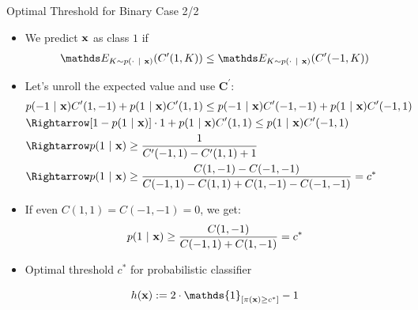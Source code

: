 \documentclass[11pt,compress,t,notes=noshow, aspectratio=169, xcolor=table]{beamer}
\begin{document}
\begin{frame}{Optimal Threshold for Binary Case 2/2}
            \begin{itemize}
            \item We predict $\mathbf{x}$ as class $1$ if 
            \begin{align*}
                \E_{K \sim p(\cdot ~|~ \xv)}( C^\prime(1,K) )  \leq \E_{K \sim p(\cdot ~|~ \xv)}( C^\prime(-1,K) ) \\
            \end{align*}

			\item Let's unroll the expected value and use $\mathbf{C}^\prime$:
            \footnotesize{
    			\begin{align*}	
                    & p(-1 ~|~ \xv ) C^\prime(1,-1)  + 	p(1 ~|~ \xv ) C^\prime(1,1) \leq  p(-1 ~|~ \xv ) C^\prime(-1,-1)  + 	p(1 ~|~ \xv ) C^\prime(-1,1)  \\ 
                    &\Rightarrow [1 - p(1 ~|~ \xv)] \cdot 1 + p(1 ~|~ \xv) C^\prime(1, 1) \leq p(1 ~|~ \xv) C^\prime(-1, 1) \\
                    &\Rightarrow p(1 ~|~ \xv) \geq \frac{1}{C^\prime(-1, 1) - C^\prime(1, 1) + 1} \\
                    &\Rightarrow p(1 ~|~ \xv) \geq \frac{C(1, -1) - C(-1, -1)}{C(-1, 1) - C(1, 1) + C(1, -1) - C(-1, -1)} = c^*
    			\end{align*}
            }
		
            \item If even $C(1, 1) = C(-1, -1) = 0 $, we get:
            \begin{align*}
                p(1 ~|~ \mathbf{x}) \geq \frac{C(1, -1)}{C(-1, 1) + C(1, -1)} = c^{*}
            \end{align*}	
            
            \item Optimal threshold $c^*$ for probabilistic classifier 
            
            $$   \hx := 2 \cdot \mathds{1}_{[ \pi(\xv) \geq c^*]} -1 $$
							
		\end{itemize}
\end{frame}
\end{document}
